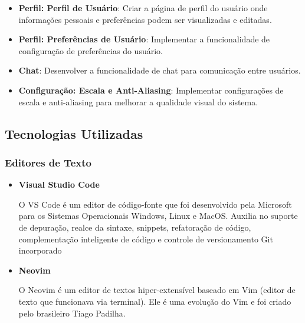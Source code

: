 \documentclass[../main.tex]{subfiles}
\begin{document}
\begin{itemize}
    \item \textbf{Perfil: Perfil de Usuário}: Criar a página de perfil do usuário onde informações pessoais e preferências podem ser visualizadas e editadas.
    \item \textbf{Perfil: Preferências de Usuário}: Implementar a funcionalidade de configuração de preferências do usuário.
    \item \textbf{Chat}: Desenvolver a funcionalidade de chat para comunicação entre usuários.
    \item \textbf{Configuração: Escala e Anti-Aliasing}: Implementar configurações de escala e anti-aliasing para melhorar a qualidade visual do sistema.
\end{itemize}


\subsection{Tecnologias Utilizadas}
\subsubsection{Editores de Texto}
\begin{itemize}
\item \textbf{Visual Studio Code}

O VS Code é um editor de código-fonte que foi desenvolvido pela Microsoft para os Sistemas Operacionais Windows, Linux e MacOS. Auxilia no suporte de depuração, realce da sintaxe, snippets, refatoração de código, complementação inteligente de código e controle de versionamento Git incorporado
\item \textbf{Neovim}

O Neovim é um editor de textos hiper-extensível baseado em Vim (editor de texto que funcionava via terminal). Ele é uma evolução do Vim e foi criado pelo brasileiro Tiago Padilha. 
\end{itemize}
\end{document}

